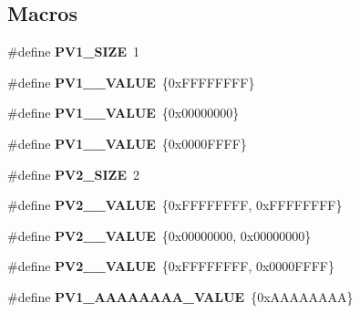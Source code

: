 \subsection*{Macros}
\begin{DoxyCompactItemize}
\item 
\mbox{\label{unit-test-bit-vector_8c_a2a699ae341bf13293afbdea04c5d9085}} 
\#define {\bfseries P\+V1\+\_\+\+S\+I\+ZE}~1
\item 
\mbox{\label{unit-test-bit-vector_8c_aa0bb5d067529fcceaaead6398aa1e15d}} 
\#define {\bfseries P\+V1\+\_\+\_\+\+V\+A\+L\+UE}~\{0x\+F\+F\+F\+F\+F\+F\+F\+F\}
\item 
\mbox{\label{unit-test-bit-vector_8c_af3dd5a0e0035c7d8ce002ebdd7fcb955}} 
\#define {\bfseries P\+V1\+\_\+\_\+\+V\+A\+L\+UE}~\{0x00000000\}
\item 
\mbox{\label{unit-test-bit-vector_8c_a7eec10033d15aed107a8f40ceeacb8b4}} 
\#define {\bfseries P\+V1\+\_\+\_\+\+V\+A\+L\+UE}~\{0x0000\+F\+F\+F\+F\}
\item 
\mbox{\label{unit-test-bit-vector_8c_a8f86d696cd0d090ef7702c27ddd2d3f3}} 
\#define {\bfseries P\+V2\+\_\+\+S\+I\+ZE}~2
\item 
\mbox{\label{unit-test-bit-vector_8c_a89fe50fddb8645ea6c2dbb1664623fdd}} 
\#define {\bfseries P\+V2\+\_\+\_\+\+V\+A\+L\+UE}~\{0x\+F\+F\+F\+F\+F\+F\+F\+F, 0x\+F\+F\+F\+F\+F\+F\+F\+F\}
\item 
\mbox{\label{unit-test-bit-vector_8c_ad5eadf9f0b984db5a7fb3261079e1823}} 
\#define {\bfseries P\+V2\+\_\+\_\+\+V\+A\+L\+UE}~\{0x00000000, 0x00000000\}
\item 
\mbox{\label{unit-test-bit-vector_8c_a0dd044dc3cbe647e899897e4e5e665af}} 
\#define {\bfseries P\+V2\+\_\+\_\+\+V\+A\+L\+UE}~\{0x\+F\+F\+F\+F\+F\+F\+F\+F, 0x0000\+F\+F\+F\+F\}
\item 
\mbox{\label{unit-test-bit-vector_8c_a3a4e0a3aa6d8376a4fa6521383450e87}} 
\#define {\bfseries P\+V1\+\_\+\+A\+A\+A\+A\+A\+A\+A\+A\+\_\+\+V\+A\+L\+UE}~\{0x\+A\+A\+A\+A\+A\+A\+A\+A\}

\end{DoxyCompactItemize}

